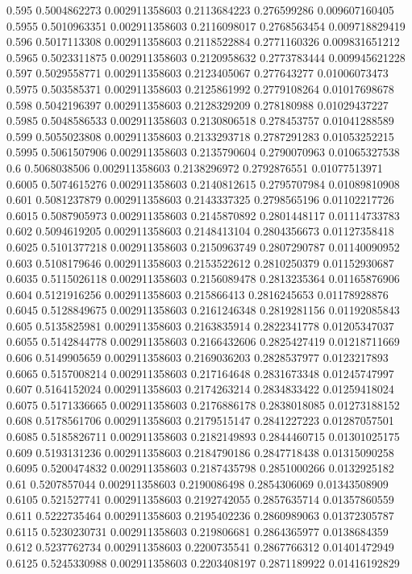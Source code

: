{0.595 0.5004862273 0.002911358603 0.2113684223 0.276599286 0.009607160405
0.5955 0.5010963351 0.002911358603 0.2116098017 0.2768563454 0.009718829419
0.596 0.5017113308 0.002911358603 0.2118522884 0.2771160326 0.009831651212
0.5965 0.5023311875 0.002911358603 0.2120958632 0.2773783444 0.009945621228
0.597 0.5029558771 0.002911358603 0.2123405067 0.277643277 0.01006073473
0.5975 0.503585371 0.002911358603 0.2125861992 0.2779108264 0.01017698678
0.598 0.5042196397 0.002911358603 0.2128329209 0.278180988 0.01029437227
0.5985 0.5048586533 0.002911358603 0.2130806518 0.278453757 0.01041288589
0.599 0.5055023808 0.002911358603 0.2133293718 0.2787291283 0.01053252215
0.5995 0.5061507906 0.002911358603 0.2135790604 0.2790070963 0.01065327538
0.6 0.5068038506 0.002911358603 0.2138296972 0.2792876551 0.01077513971
0.6005 0.5074615276 0.002911358603 0.2140812615 0.2795707984 0.01089810908
0.601 0.5081237879 0.002911358603 0.2143337325 0.2798565196 0.01102217726
0.6015 0.5087905973 0.002911358603 0.2145870892 0.2801448117 0.01114733783
0.602 0.5094619205 0.002911358603 0.2148413104 0.2804356673 0.01127358418
0.6025 0.5101377218 0.002911358603 0.2150963749 0.2807290787 0.01140090952
0.603 0.5108179646 0.002911358603 0.2153522612 0.2810250379 0.01152930687
0.6035 0.5115026118 0.002911358603 0.2156089478 0.2813235364 0.01165876906
0.604 0.5121916256 0.002911358603 0.215866413 0.2816245653 0.01178928876
0.6045 0.5128849675 0.002911358603 0.2161246348 0.2819281156 0.01192085843
0.605 0.5135825981 0.002911358603 0.2163835914 0.2822341778 0.01205347037
0.6055 0.5142844778 0.002911358603 0.2166432606 0.2825427419 0.01218711669
0.606 0.5149905659 0.002911358603 0.2169036203 0.2828537977 0.0123217893
0.6065 0.5157008214 0.002911358603 0.217164648 0.2831673348 0.01245747997
0.607 0.5164152024 0.002911358603 0.2174263214 0.2834833422 0.01259418024
0.6075 0.5171336665 0.002911358603 0.2176886178 0.2838018085 0.01273188152
0.608 0.5178561706 0.002911358603 0.2179515147 0.2841227223 0.01287057501
0.6085 0.5185826711 0.002911358603 0.2182149893 0.2844460715 0.01301025175
0.609 0.5193131236 0.002911358603 0.2184790186 0.2847718438 0.01315090258
0.6095 0.5200474832 0.002911358603 0.2187435798 0.2851000266 0.0132925182
0.61 0.5207857044 0.002911358603 0.2190086498 0.2854306069 0.01343508909
0.6105 0.521527741 0.002911358603 0.2192742055 0.2857635714 0.01357860559
0.611 0.5222735464 0.002911358603 0.2195402236 0.2860989063 0.01372305787
0.6115 0.5230230731 0.002911358603 0.219806681 0.2864365977 0.0138684359
0.612 0.5237762734 0.002911358603 0.2200735541 0.2867766312 0.01401472949
0.6125 0.5245330988 0.002911358603 0.2203408197 0.2871189922 0.01416192829
}
